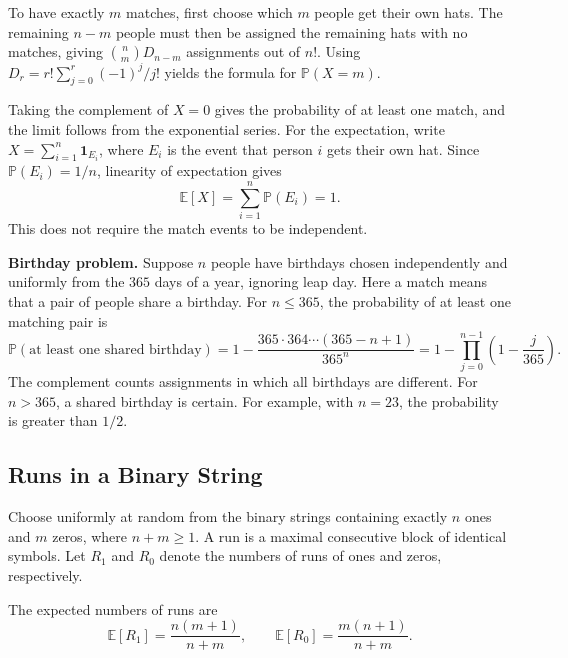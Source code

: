 \documentclass[a4paper,11pt,abstracton]{scrartcl}
\theoremstyle{dotlessP}
\theoremstyle{dotlessS}
\theoremstyle{remark}
\theoremstyle{definition}
\begin{document}
\begin{claim_box}
To have exactly $m$ matches, first choose which $m$ people get their own hats. The remaining $n-m$ people must then be assigned the remaining hats with no matches, giving $\binom{n}{m}D_{n-m}$ assignments out of $n!$. Using $D_r=r!\sum_{j=0}^{r}(-1)^j/j!$ yields the formula for $\mathbb{P}(X=m)$.

Taking the complement of $X=0$ gives the probability of at least one match, and the limit follows from the exponential series. For the expectation, write $X=\sum_{i=1}^{n}\mathbf{1}_{E_i}$, where $E_i$ is the event that person $i$ gets their own hat. Since $\mathbb{P}(E_i)=1/n$, linearity of expectation gives
\[
  \mathbb{E}[X]=\sum_{i=1}^{n}\mathbb{P}(E_i)=1.
\]
This does not require the match events to be independent.
\end{claim_box}

\begin{example_box}
\textbf{Birthday problem.} Suppose $n$ people have birthdays chosen independently and uniformly from the $365$ days of a year, ignoring leap day. Here a match means that a pair of people share a birthday. For $n\leq365$, the probability of at least one matching pair is
\[
  \mathbb{P}(\text{at least one shared birthday})
  =1-\frac{365\cdot364\cdots(365-n+1)}{365^n}
  =1-\prod_{j=0}^{n-1}\left(1-\frac{j}{365}\right).
\]
The complement counts assignments in which all birthdays are different. For $n>365$, a shared birthday is certain. For example, with $n=23$, the probability is greater than $1/2$.
\end{example_box}

\subsection{Runs in a Binary String}

Choose uniformly at random from the binary strings containing exactly $n$ ones and $m$ zeros, where $n+m\geq1$. A run is a maximal consecutive block of identical symbols. Let $R_1$ and $R_0$ denote the numbers of runs of ones and zeros, respectively.

\begin{problem_box}
The expected numbers of runs are
\[
  \mathbb{E}[R_1]=\frac{n(m+1)}{n+m},
  \qquad
  \mathbb{E}[R_0]=\frac{m(n+1)}{n+m}.
\]
\end{problem_box}
\end{document}
